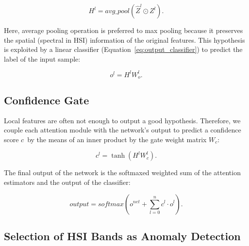 \documentclass[journal]{IEEEtran}
\newcommand{\ConfidenceScore}{$c$}
\begin{document}
\begin{equation}
H^{l}=avg\_pool(\hat{Z}^{l}\odot Z^{l}).
\end{equation}

\noindent Here, average pooling operation is preferred to max pooling because it preserves the spatial (spectral in HSI) information of the original features. This hypothesis is exploited by a linear classifier (Equation~\ref{eq:output_classifier}) to predict the label of the input sample:

\begin{equation}
o^{l}=H^{l}W_{o}^{l}.
\label{eq:output_classifier}
\end{equation}

\subsection{Confidence Gate}

Local features are often not enough to output a good hypothesis. Therefore, we couple each attention module with the network's output to predict a confidence score \ConfidenceScore~by the means of an inner product by the gate weight matrix $W_c$:

\begin{equation}
c^{l}=\tanh(H^{l}W^{l}_c).
\end{equation}

\noindent The final output of the network is the softmaxed weighted sum of the attention estimators and the output of the classifier:

\begin{equation}
output = softmax(o^{net} + \sum\limits_{l=0}^n c^{l}\cdot o^{l}).
\end{equation}

\subsection{Selection of HSI Bands as Anomaly Detection}
\end{document}
